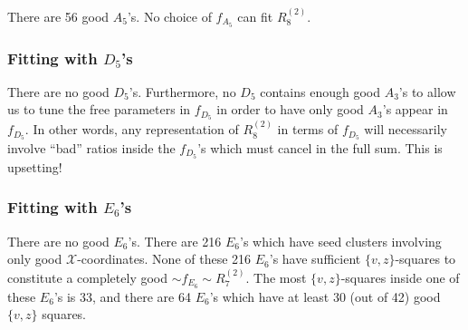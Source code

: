 \documentclass[12pt]{article}
\begin{document}
There are 56 good $A_5$'s. No choice of $f_{A_5}$ can fit $R^{(2)}_8$.

\subsubsection*{Fitting with $D_5$'s}

There are no good $D_5$'s. Furthermore, no $D_5$ contains enough good $A_3$'s to allow us to tune the free parameters in $f_{D_5}$ in order to have only good $A_3$'s appear in $f_{D_5}$. In other words, any representation of $R^{(2)}_8$ in terms of $f_{D_5}$ will necessarily involve ``bad'' ratios inside the $f_{D_5}$'s which must cancel in the full sum. This is upsetting! 

\subsubsection*{Fitting with $E_6$'s}

There are no good $E_6$'s. There are 216 $E_6$'s which have seed clusters involving only good $\mathcal{X}$-coordinates. None of these 216 $E_6$'s have sufficient $\{v,z\}$-squares to constitute a completely good $\sim f_{E_6} \sim R^{(2)}_7$. The most $\{v,z\}$-squares inside one of these $E_6$'s is 33, and there are 64 $E_6$'s which have at least 30 (out of 42) good $\{v,z\}$ squares. 
\end{document}
